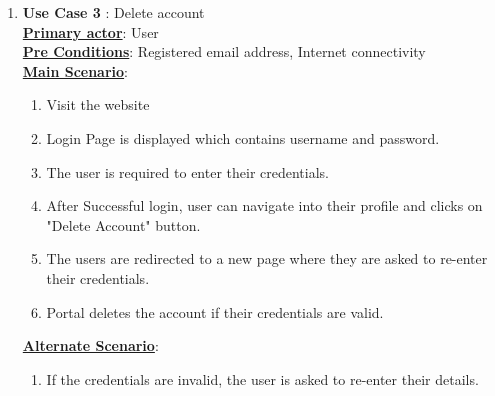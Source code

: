 \documentclass[english,a4paper,12pt]{report}
\begin{document}
\begin{enumerate}
\item \textbf{Use Case 3 }: Delete account \\
\underline{\textbf{Primary actor}}: User \\
\underline{\textbf{Pre Conditions}}: Registered email address, Internet connectivity\\
\underline{\textbf{Main Scenario}}:
\begin{enumerate}
    \item Visit the website
    \item Login Page is displayed which contains username and password.
    \item The user is required to enter their credentials.
    \item After Successful login, user can navigate into their profile and clicks on "Delete Account" button.
    \item The users are redirected to a new page where they are asked to re-enter their credentials.
    \item Portal deletes the account if their credentials are valid.
\end{enumerate}
\underline{\textbf{Alternate Scenario}}:
\begin{enumerate}
    \item If the credentials are invalid, the user is asked to re-enter their details.
\end{enumerate}



\end{enumerate}
\end{document}
